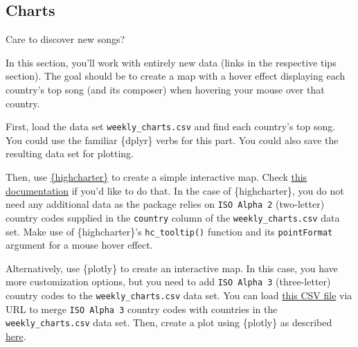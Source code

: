 \documentclass[
  11pt,
]{book}
\newenvironment{tips}[1]
  {
  \begin{itemize}
  \footnotesize
  \renewcommand{\labelitemi}{
    \raisebox{-.7\height}[0pt][0pt]{
      {\setkeys{Gin}{width=3em,keepaspectratio}
        \texttt{[image: images/\#1.png]}}
    }
  }
  \setlength{\fboxsep}{1em}
  \begin{rbox}
  \item
  }
  {
  \end{rbox}
  \end{itemize}
  }
\begin{document}
\hypertarget{charts}{%
\subsection{Charts}\label{charts}}

Care to discover new songs?

In this section, you'll work with entirely new data (links in the respective tips section).
The goal should be to create a map with a hover effect displaying each country's top song (and its composer) when hovering your mouse over that country.

\begin{tips}r

First, load the data set \texttt{weekly\_charts.csv} and find each country's top song. You could use the familiar \{dplyr\} verbs for this part. You could also save the resulting data set for plotting.

Then, use \href{https://jkunst.com/highcharter/}{\{highcharter\}} to create a simple interactive map. Check \href{https://jkunst.com/highcharter/articles/maps.html}{this documentation} if you'd like to do that. In the case of \{highcharter\}, you do not need any additional data as the package relies on \texttt{ISO\ Alpha\ 2} (two-letter) country codes supplied in the \texttt{country} column of the \texttt{weekly\_charts.csv} data set. Make use of \{highcharter\}'s \texttt{hc\_tooltip()} function and its \texttt{pointFormat} argument for a mouse hover effect.

Alternatively, use \{plotly\} to create an interactive map. In this case, you have more customization options, but you need to add \texttt{ISO\ Alpha\ 3} (three-letter) country codes to the \texttt{weekly\_charts.csv} data set. You can load \href{https://github.com/lukes/ISO-3166-Countries-with-Regional-Codes/blob/master/all/all.csv}{this CSV file} via URL to merge \texttt{ISO\ Alpha\ 3} country codes with countries in the \texttt{weekly\_charts.csv} data set. Then, create a plot using \{plotly\} as described \href{https://plotly.com/r/choropleth-maps/}{here}.

\end{tips}
\end{document}
